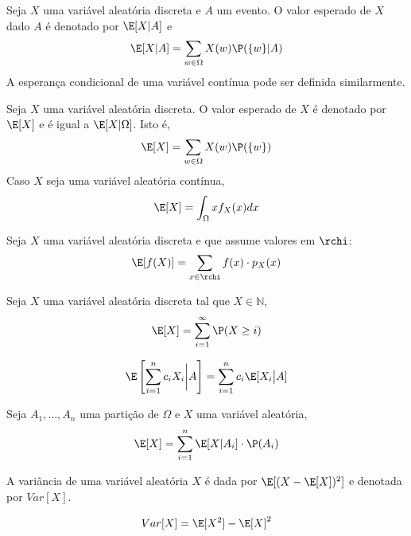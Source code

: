 \begin{definition}
 \label{defn:conditional_expectation}
 Seja $X$ uma variável aleatória discreta e $A$ um evento. 
 O valor esperado de $X$ dado $A$ é denotado por $\E[X|A]$ e
 $$\E[X|A] = \sum_{w \in \Omega}{X(w)\P(\{w\}|A)}$$
 A esperança condicional de uma variável contínua pode ser definida similarmente.
\end{definition}

\begin{definition}
 \label{defn:expectation}
 Seja $X$ uma variável aleatória discreta. 
 O valor esperado de $X$ é denotado por $\E[X]$ e é igual a $\E[X|\Omega]$.
 Isto é,
 $$\E[X] = \sum_{w \in \Omega}{X(w)\P(\{w\})}$$
 Caso $X$ seja uma variável aleatória contínua,
 $$\E[X] = \int_{\Omega}{x f_{X}(x) dx}$$
\end{definition}

\begin{lemma} Seja $X$ uma variável aleatória discreta e que assume valores em $\rchi$:
 \label{unconscious_statistician}
 $$\E[f(X)] = \sum_{x \in \rchi}{f(x) \cdot p_{X}(x)}$$
\end{lemma}

\begin{lemma}
 \label{lemma:expectationProb}
 Seja $X$ uma variável aleatória discreta tal que $X \in \mathbb{N}$,
 $$\E[X] = \sum_{i=1}^{\infty}{\P(X \geq i)}$$
\end{lemma}
	
\begin{lemma}
 \label{expectation_additivity}
 \[ \E\left[\sum_{i=1}^{n}{c_{i} X_{i}}\bigg|A\right] = \sum_{i=1}^{n}{c_{i} \E[X_{i}\big|A]} \]
\end{lemma}

\begin{lemma}
 \label{expectation_tower}
 Seja $A_{1}, \ldots, A_{n}$ uma partição de $\Omega$ e $X$ uma variável aleatória,
 $$\E[X] = \sum_{i=1}^{n}{\E[X|A_{i}] \cdot \P(A_{i})}$$
\end{lemma}

\begin{definition}[Variância]
 \label{variance}
 A variância de uma variável aleatória $X$ é dada por $\E[(X-\E[X])^{2}]$ e denotada por $Var[X]$. 
\end{definition}
	
\begin{lemma}
 \label{l2_trick}
 \[ Var[X] = \E[X^{2}] - \E[X]^{2} \]
\end{lemma}
	
